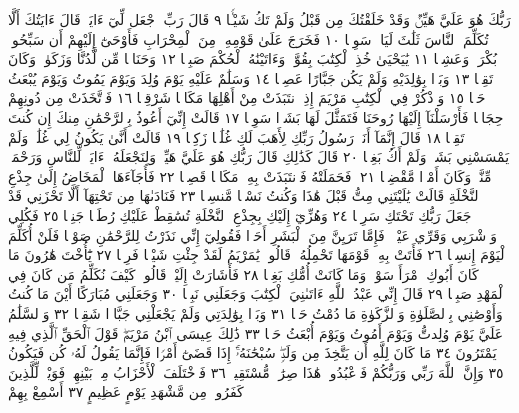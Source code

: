 رَبُّكَ هُوَ عَلَيَّ هَيِّنࣱ وَقَدْ خَلَقْتُكَ مِن قَبْلُ وَلَمْ تَكُ
شَيْـࣰٔا ٩ قَالَ رَبِّ ٱجْعَل لِّيٓ ءَايَةࣰۖ قَالَ ءَايَتُكَ أَلَّا
تُكَلِّمَ ٱلنَّاسَ ثَلَٰثَ لَيَالࣲ سَوِيࣰّا ١٠ فَخَرَجَ عَلَىٰ قَوْمِهِۦ مِنَ
ٱلْمِحْرَابِ فَأَوْحَىٰٓ إِلَيْهِمْ أَن سَبِّحُوا۟ بُكْرَةࣰ وَعَشِيࣰّا ١١
يَٰيَحْيَىٰ خُذِ ٱلْكِتَٰبَ بِقُوَّةࣲۖ وَءَاتَيْنَٰهُ ٱلْحُكْمَ صَبِيࣰّا ١٢
وَحَنَانࣰا مِّن لَّدُنَّا وَزَكَوٰةࣰۖ وَكَانَ تَقِيࣰّا ١٣ وَبَرَّۢا بِوَٰلِدَيْهِ وَلَمْ
يَكُن جَبَّارًا عَصِيࣰّا ١٤ وَسَلَٰمٌ عَلَيْهِ يَوْمَ وُلِدَ وَيَوْمَ يَمُوتُ
وَيَوْمَ يُبْعَثُ حَيࣰّا ١٥ وَٱذْكُرْ فِي ٱلْكِتَٰبِ مَرْيَمَ إِذِ ٱنتَبَذَتْ
مِنْ أَهْلِهَا مَكَانࣰا شَرْقِيࣰّا ١٦ فَٱتَّخَذَتْ مِن دُونِهِمْ حِجَابࣰا
فَأَرْسَلْنَآ إِلَيْهَا رُوحَنَا فَتَمَثَّلَ لَهَا بَشَرࣰا سَوِيࣰّا ١٧ قَالَتْ إِنِّيٓ
أَعُوذُ بِٱلرَّحْمَٰنِ مِنكَ إِن كُنتَ تَقِيࣰّا ١٨ قَالَ إِنَّمَآ أَنَا۠ رَسُولُ
رَبِّكِ لِأَهَبَ لَكِ غُلَٰمࣰا زَكِيࣰّا ١٩ قَالَتْ أَنَّىٰ يَكُونُ لِي
غُلَٰمࣱ وَلَمْ يَمْسَسْنِي بَشَرࣱ وَلَمْ أَكُ بَغِيࣰّا ٢٠ قَالَ كَذَٰلِكِ
قَالَ رَبُّكِ هُوَ عَلَيَّ هَيِّنࣱۖ وَلِنَجْعَلَهُۥٓ ءَايَةࣰ لِّلنَّاسِ وَرَحْمَةࣰ
مِّنَّاۚ وَكَانَ أَمْرࣰا مَّقْضِيࣰّا ٢١۞ فَحَمَلَتْهُ فَٱنتَبَذَتْ بِهِۦ
مَكَانࣰا قَصِيࣰّا ٢٢ فَأَجَآءَهَا ٱلْمَخَاضُ إِلَىٰ جِذْعِ ٱلنَّخْلَةِ
قَالَتْ يَٰلَيْتَنِي مِتُّ قَبْلَ هَٰذَا وَكُنتُ نَسْيࣰا مَّنسِيࣰّا ٢٣
فَنَادَىٰهَا مِن تَحْتِهَآ أَلَّا تَحْزَنِي قَدْ جَعَلَ رَبُّكِ تَحْتَكِ سَرِيࣰّا ٢٤
وَهُزِّيٓ إِلَيْكِ بِجِذْعِ ٱلنَّخْلَةِ تُسَٰقِطْ عَلَيْكِ رُطَبࣰا جَنِيࣰّا ٢٥
فَكُلِي وَٱشْرَبِي وَقَرِّي عَيْنࣰاۖ فَإِمَّا تَرَيِنَّ مِنَ ٱلْبَشَرِ أَحَدࣰا فَقُولِيٓ
إِنِّي نَذَرْتُ لِلرَّحْمَٰنِ صَوْمࣰا فَلَنْ أُكَلِّمَ ٱلْيَوْمَ إِنسِيࣰّا ٢٦ فَأَتَتْ
بِهِۦ قَوْمَهَا تَحْمِلُهُۥۖ قَالُوا۟ يَٰمَرْيَمُ لَقَدْ جِئْتِ شَيْـࣰٔا فَرِيࣰّا ٢٧
يَٰٓأُخْتَ هَٰرُونَ مَا كَانَ أَبُوكِ ٱمْرَأَ سَوْءࣲ وَمَا كَانَتْ
أُمُّكِ بَغِيࣰّا ٢٨ فَأَشَارَتْ إِلَيْهِۖ قَالُوا۟ كَيْفَ نُكَلِّمُ مَن كَانَ فِي
ٱلْمَهْدِ صَبِيࣰّا ٢٩ قَالَ إِنِّي عَبْدُ ٱللَّهِ ءَاتَىٰنِيَ ٱلْكِتَٰبَ وَجَعَلَنِي
نَبِيࣰّا ٣٠ وَجَعَلَنِي مُبَارَكًا أَيْنَ مَا كُنتُ وَأَوْصَٰنِي بِٱلصَّلَوٰةِ
وَٱلزَّكَوٰةِ مَا دُمْتُ حَيࣰّا ٣١ وَبَرَّۢا بِوَٰلِدَتِي وَلَمْ يَجْعَلْنِي
جَبَّارࣰا شَقِيࣰّا ٣٢ وَٱلسَّلَٰمُ عَلَيَّ يَوْمَ وُلِدتُّ وَيَوْمَ أَمُوتُ
وَيَوْمَ أُبْعَثُ حَيࣰّا ٣٣ ذَٰلِكَ عِيسَى ٱبْنُ مَرْيَمَۖ قَوْلَ ٱلْحَقِّ
ٱلَّذِي فِيهِ يَمْتَرُونَ ٣٤ مَا كَانَ لِلَّهِ أَن يَتَّخِذَ مِن وَلَدࣲۖ سُبْحَٰنَهُۥٓۚ
إِذَا قَضَىٰٓ أَمْرࣰا فَإِنَّمَا يَقُولُ لَهُۥ كُن فَيَكُونُ ٣٥ وَإِنَّ ٱللَّهَ رَبِّي وَرَبُّكُمْ
فَٱعْبُدُوهُۚ هَٰذَا صِرَٰطࣱ مُّسْتَقِيمࣱ ٣٦ فَٱخْتَلَفَ ٱلْأَحْزَابُ مِنۢ
بَيْنِهِمْۖ فَوَيْلࣱ لِّلَّذِينَ كَفَرُوا۟ مِن مَّشْهَدِ يَوْمٍ عَظِيمٍ ٣٧ أَسْمِعْ بِهِمْ
